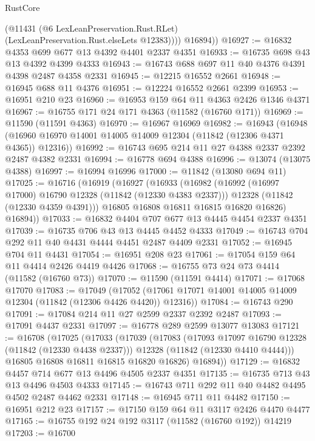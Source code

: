 \begin{lexlean}{RustCore}
\begin{coremodule}
            (@11431 (@6 LexLeanPreservation.Rust.RLet) (LexLeanPreservation.Rust.elseLets @12383))))
        @16894))
@16927 := @16832 @4353 @699 @677 @13 @4392 @4401 @2337 @4351
@16933 := @16735 @698 @43 @13 @4392 @4399 @4333
@16943 := @16743 @688 @697 @11 @40 @4376 @4391 @4398 @2487 @4358 @2331
@16945 := @12215 @16552 @2661
@16948 := @16945 @688 @11 @4376
@16951 := @12224 @16552 @2661 @2399
@16953 := @16951 @210 @23
@16960 := @16953 @159 @64 @11 @4363 @2426 @1346 @4371
@16967 := @16755 @171 @24 @171 @4363 (@11582 (@16760 @171))
@16969 := @11590 (@11591 @4363)
@16970 := @16967 @16969
@16982 := @16943
    (@16948 (@16960 @16970 @14001 @14005 @14009 @12304 (@11842 (@12306 @4371 @4365)) @12316))
@16992 := @16743 @695 @214 @11 @27 @4388 @2337 @2392 @2487 @4382 @2331
@16994 := @16778 @694 @4388
@16996 := @13074 (@13075 @4388)
@16997 := @16994 @16996
@17000 := @11842 (@13080 @694 @11)
@17025 := @16716
    (@16919
      (@16927
        (@16933
          (@16982
            (@16992 (@16997 @17000) @16790 @12328 (@11842 (@12330 @4383 @2337)))
            @12328
            (@11842 (@12330 @4359 @4391)))
          @16805
          @16808
          @16811
          @16815
          @16820
          @16826)
        @16894))
@17033 := @16832 @4404 @707 @677 @13 @4445 @4454 @2337 @4351
@17039 := @16735 @706 @43 @13 @4445 @4452 @4333
@17049 := @16743 @704 @292 @11 @40 @4431 @4444 @4451 @2487 @4409 @2331
@17052 := @16945 @704 @11 @4431
@17054 := @16951 @208 @23
@17061 := @17054 @159 @64 @11 @4414 @2426 @4419 @4426
@17068 := @16755 @73 @24 @73 @4414 (@11582 (@16760 @73))
@17070 := @11590 (@11591 @4414)
@17071 := @17068 @17070
@17083 := @17049
    (@17052 (@17061 @17071 @14001 @14005 @14009 @12304 (@11842 (@12306 @4426 @4420)) @12316))
@17084 := @16743 @290
@17091 := @17084 @214 @11 @27 @2599 @2337 @2392 @2487
@17093 := @17091 @4437 @2331
@17097 := @16778 @289 @2599 @13077 @13083
@17121 := @16708
    (@17025
      (@17033
        (@17039
          (@17083
            (@17093 @17097 @16790 @12328 (@11842 (@12330 @4438 @2337)))
            @12328
            (@11842 (@12330 @4410 @4444)))
          @16805
          @16808
          @16811
          @16815
          @16820
          @16826)
        @16894))
@17129 := @16832 @4457 @714 @677 @13 @4496 @4505 @2337 @4351
@17135 := @16735 @713 @43 @13 @4496 @4503 @4333
@17145 := @16743 @711 @292 @11 @40 @4482 @4495 @4502 @2487 @4462 @2331
@17148 := @16945 @711 @11 @4482
@17150 := @16951 @212 @23
@17157 := @17150 @159 @64 @11 @3117 @2426 @4470 @4477
@17165 := @16755 @192 @24 @192 @3117 (@11582 (@16760 @192)) @14219
@17203 := @16700

\end{coremodule}
\end{lexlean}
